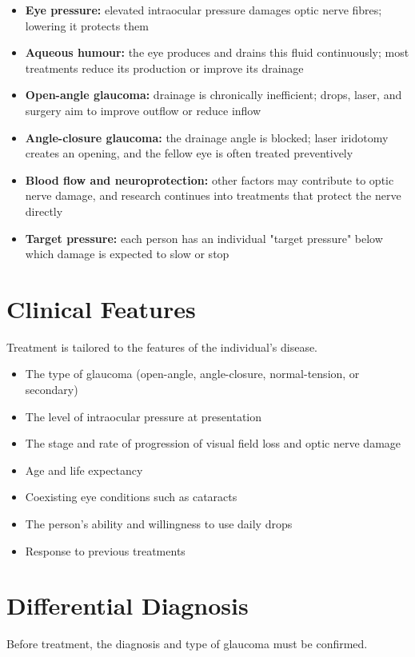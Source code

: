 \begin{itemize}
    \item \textbf{Eye pressure:} elevated intraocular pressure damages optic nerve fibres; lowering it protects them
    \item \textbf{Aqueous humour:} the eye produces and drains this fluid continuously; most treatments reduce its production or improve its drainage
    \item \textbf{Open-angle glaucoma:} drainage is chronically inefficient; drops, laser, and surgery aim to improve outflow or reduce inflow
    \item \textbf{Angle-closure glaucoma:} the drainage angle is blocked; laser iridotomy creates an opening, and the fellow eye is often treated preventively
    \item \textbf{Blood flow and neuroprotection:} other factors may contribute to optic nerve damage, and research continues into treatments that protect the nerve directly
    \item \textbf{Target pressure:} each person has an individual "target pressure" below which damage is expected to slow or stop
\end{itemize}

\section*{Clinical Features}
Treatment is tailored to the features of the individual's disease.

\begin{itemize}
    \item The type of glaucoma (open-angle, angle-closure, normal-tension, or secondary)
    \item The level of intraocular pressure at presentation
    \item The stage and rate of progression of visual field loss and optic nerve damage
    \item Age and life expectancy
    \item Coexisting eye conditions such as cataracts
    \item The person's ability and willingness to use daily drops
    \item Response to previous treatments
\end{itemize}

\section*{Differential Diagnosis}
Before treatment, the diagnosis and type of glaucoma must be confirmed.

